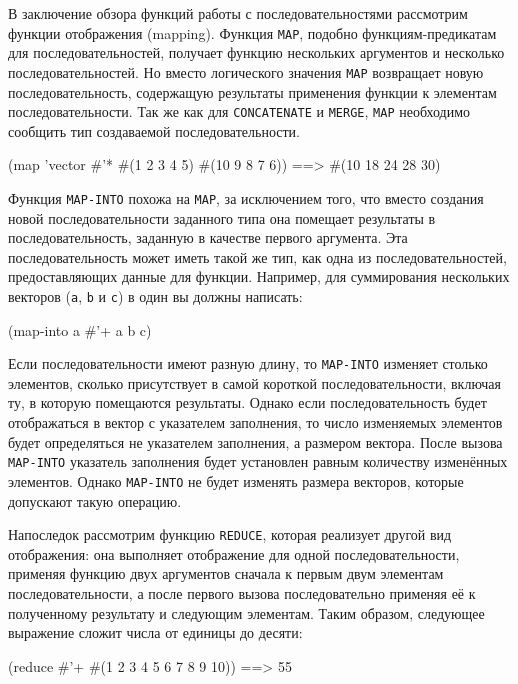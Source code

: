 В заключение обзора функций работы с последовательностями рассмотрим
функции отображения (mapping).  Функция \lstinline{MAP}, подобно функциям-предикатам для
последовательностей, получает функцию нескольких аргументов и несколько
последовательностей.  Но вместо логического значения \lstinline{MAP} возвращает новую
последовательность, содержащую результаты применения функции к элементам
последовательности.  Так же как для \lstinline{CONCATENATE} и \lstinline{MERGE}, \lstinline{MAP}
необходимо сообщить тип создаваемой последовательности.

\begin{myverb}
(map 'vector #'* #(1 2 3 4 5) #(10 9 8 7 6)) ==> #(10 18 24 28 30)
\end{myverb}

Функция \lstinline{MAP-INTO} похожа на \lstinline{MAP}, за исключением того, что вместо создания
новой последовательности заданного типа она помещает результаты в последовательность,
заданную в качестве первого аргумента.  Эта последовательность может иметь такой же тип,
как одна из последовательностей, предоставляющих данные для функции.  Например, для
суммирования нескольких векторов (\lstinline{a}, \lstinline{b} и \lstinline{c}) в один вы должны
написать:

\begin{myverb}
(map-into a #'+ a b c)
\end{myverb}

Если последовательности имеют разную длину, то \lstinline{MAP-INTO} изменяет столько элементов,
сколько присутствует в самой короткой последовательности, включая ту, в которую помещаются
результаты.  Однако если последовательность будет отображаться в вектор с указателем
заполнения, то число изменяемых элементов будет определяться не указателем заполнения, а
размером вектора.  После вызова \lstinline{MAP-INTO} указатель заполнения будет установлен
равным количеству изменённых элементов. Однако \lstinline{MAP-INTO} не будет изменять размера
векторов, которые допускают такую операцию.

Напоследок рассмотрим функцию \lstinline{REDUCE},
которая реализует другой вид отображения: она выполняет отображение для
одной последовательности, применяя функцию двух аргументов сначала к первым двум элементам
последовательности, а после первого вызова последовательно применяя её к полученному
результату и следующим элементам.  Таким образом, следующее выражение сложит числа от
единицы до десяти:

\begin{myverb}
(reduce #'+ #(1 2 3 4 5 6 7 8 9 10)) ==> 55
\end{myverb}

